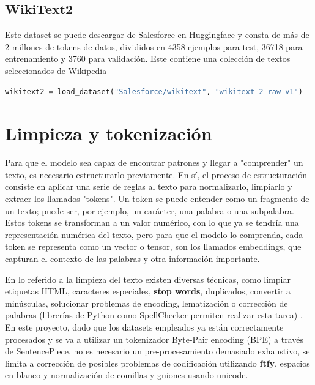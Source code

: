 \documentclass[11pt]{book}
\begin{document}
\subsection{WikiText2}
Este dataset se puede descargar de Salesforce en Huggingface y consta de más de 2 millones de tokens de datos, divididos en 4358 ejemplos para test, 36718 para entrenamiento y 3760 para validación. Este contiene una colección de textos seleccionados de Wikipedia \parencite{huggingface_wikitext} \parencite{autonlp2020linkedwikitext}

\begin{lstlisting}[language=Python]
wikitext2 = load_dataset("Salesforce/wikitext", "wikitext-2-raw-v1")
\end{lstlisting}

\section{Limpieza y tokenización}
Para que el modelo sea capaz de encontrar patrones y llegar a "comprender" un texto, es necesario estructurarlo previamente. En sí, el proceso de estructuración consiste en aplicar una serie de reglas al texto para normalizarlo, limpiarlo y extraer los llamados "tokens". Un token se puede entender como un fragmento de un texto; puede ser, por ejemplo, un carácter, una palabra o una subpalabra. Estos tokens se transforman a un valor numérico, con lo que ya se tendría una representación numérica del texto, pero para que el modelo lo comprenda, cada token se representa como un vector o tensor, son los llamados embeddings, que capturan el contexto de las palabras y otra información importante. \parencite{lmpo2020bpe}


En lo referido a la limpieza del texto existen diversas técnicas, como limpiar etiquetas HTML, caracteres especiales, \textbf{stop words}, duplicados, convertir a minúsculas, solucionar problemas de encoding, lematización o corrección de palabras (librerías de Python como SpellChecker permiten realizar esta tarea) \parencite{shabbir2021cleaning}. En este proyecto, dado que los datasets empleados ya están correctamente procesados y se va a utilizar un tokenizador Byte-Pair encoding (BPE) a través de SentencePiece, no es necesario un pre-procesamiento demasiado exhaustivo, se limita a corrección de posibles problemas de codificación utilizando \textbf{ftfy}, espacios en blanco y normalización de comillas y guiones usando unicode.
\end{document}
